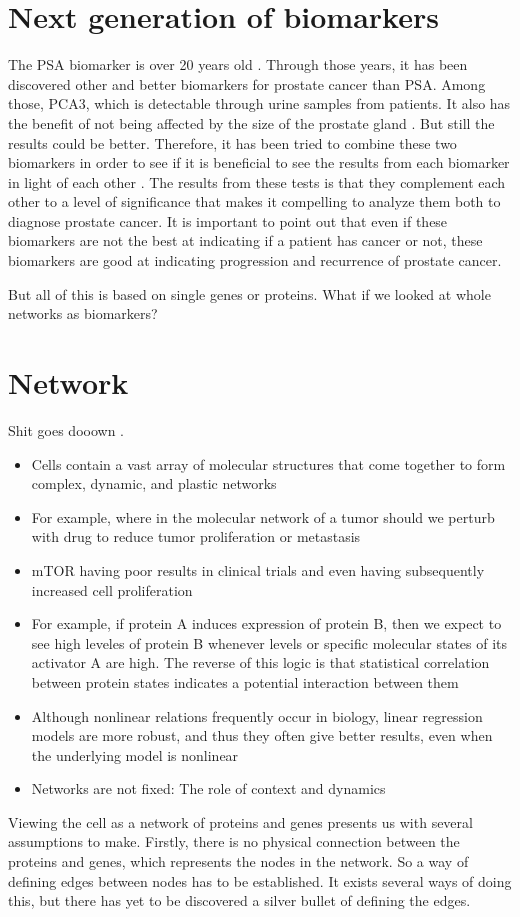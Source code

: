 \documentclass[UKenglish,11pt,a4paper]{article}
\begin{document}
\section{Next generation of biomarkers}
The PSA biomarker is over 20 years old \cite{psa-age}. Through those years, it has been discovered other and better
biomarkers for prostate cancer than PSA. Among those, PCA3, which is detectable through urine samples from patients. It
also has the benefit of not being affected by the size of the prostate gland \cite{pca3-size}. But still the results
could be better. Therefore, it has been tried to combine these two biomarkers in order to see if it is beneficial to
see the results from each biomarker in light of each other \cite{beyondpsa}. The results from these tests is that they
complement each other to a level of significance that makes it compelling to analyze them both to diagnose prostate
cancer. It is important to point out that even if these biomarkers are not the best at indicating if a patient has 
cancer or not, these biomarkers are good at indicating progression and recurrence of prostate cancer.

But all of this is based on single genes or proteins. What if we looked at whole networks as biomarkers?
\section{Network}
Shit goes dooown \cite{networkmodels}.
\begin{itemize}
    \item Cells contain a vast array of molecular structures that come together to form complex, dynamic, and plastic
        networks
    \item For example, where in the molecular network of a tumor should we perturb with drug to reduce tumor
        proliferation or metastasis
    \item mTOR having poor results in clinical trials and even having subsequently increased cell proliferation
    \item For example, if protein A induces expression of protein B, then we expect to see high leveles of protein B
        whenever levels or specific molecular states of its activator A are high. The reverse of this logic is that
        statistical correlation between protein states indicates a potential interaction between them
    \item Although nonlinear relations frequently occur in biology, linear regression models are more robust, and thus
        they often give better results, even when the underlying model is nonlinear
    \item Networks are not fixed: The role of context and dynamics
\end{itemize}
Viewing the cell as a network of proteins and genes presents us with several assumptions to make. Firstly, there is no
physical connection between the proteins and genes, which represents the nodes in the network. So a way of defining
edges between nodes has to be established. It exists several ways of doing this, but there has yet to be discovered a
silver bullet of defining the edges. %
\end{document}
